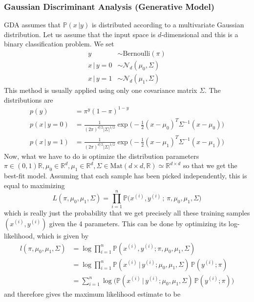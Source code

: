 \documentclass{article}
\theoremstyle{definition}
\theoremstyle{remark}
\theoremstyle{definition}
\begin{document}
\subsubsection{Gaussian Discriminant Analysis (Generative Model)}

GDA assumes that $\mathbb{P}(x\,|y)$ is distributed according to a multivariate Gaussian distribution. Let us assume that the input space is $d$-dimensional and this is a binary classification problem. We set 
\begin{align*} 
y & \sim \text{Bernoulli}(\pi) \\
x\,|\,y = 0 & \sim \mathcal{N}_d (\mu_0, \Sigma) \\
x\,|\,y = 1 & \sim \mathcal{N}_d (\mu_1, \Sigma)
\end{align*}
This method is usually applied using only one covariance matrix $\Sigma$. The distributions are
\begin{align*}
    p(y) & = \pi^y (1 - \pi)^{1-y} \\
    p(x\,|\,y = 0) & = \frac{1}{(2\pi)^{d/2} |\Sigma|^{1/2}} \exp \bigg(-\frac{1}{2} (x - \mu_0)^T \Sigma^{-1} (x - \mu_0)\bigg) \\
    p(x\,|\,y= 1) & = \frac{1}{(2\pi)^{d/2} |\Sigma|^{1/2}} \exp \bigg(-\frac{1}{2} (x - \mu_1)^T \Sigma^{-1} (x - \mu_1)\bigg)
\end{align*}
Now, what we have to do is optimize the distribution parameters $\pi \in (0, 1) \mathbb{R}, \mu_0 \in \mathbb{R}^d, \mu_1 \in \mathbb{R}^d, \Sigma \in \text{Mat}(d \times d, \mathbb{R}) \simeq \mathbb{R}^{d \times d}$ so that we get the best-fit model. Assuming that each sample has been picked independently, this is equal to maximizing 
\[L(\pi, \mu_0, \mu_1, \Sigma) = \prod_{i=1}^n \mathbb{P}\big( x^{(i)}, y^{(i)}\,;\, \pi, \mu_0, \mu_1, \Sigma\big)\]
which is really just the probability that we get precisely all these training samples $(x^{(i)}, y^{(i)})$ given the 4 parameters. This can be done by optimizing its log-likelihood, which is given by 
\begin{align*}
l(\pi, \mu_0, \mu_1, \Sigma) & = \log \prod_{i=1}^n \mathbb{P}(x^{(i)}, y^{(i)}; \pi, \mu_0, \mu_1, \Sigma) \\
& = \log \prod_{i=1}^n \mathbb{P}( x^{(i)} \,|\, y^{(i)}; \mu_0, \mu_1, \Sigma) \, \mathbb{P}(y^{(i)}; \pi) \\
& = \sum_{i=1}^n \log \bigg( \mathbb{P}( x^{(i)} \,|\, y^{(i)}; \mu_0, \mu_1, \Sigma) \, \mathbb{P}(y^{(i)}; \pi) \bigg)
\end{align*}
and therefore gives the maximum likelihood estimate to be 
\end{document}
